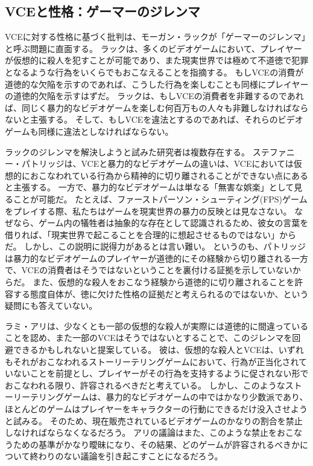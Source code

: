 \documentclass[paper=a4,book,openany]{jlreq} \usepackage{mystyle}
\begin{document}
\subsection{VCEと性格：ゲーマーのジレンマ}

VCEに対する性格に基づく批判は、モーガン・ラックが「ゲーマーのジレンマ」と呼ぶ問題に直面する。
ラックは、多くのビデオゲームにおいて、プレイヤーが仮想的に殺人を犯すことが可能であり、また現実世界では極めて不道徳で犯罪となるような行為をいくらでもおこなえることを指摘する。
もしVCEの消費が道徳的な欠陥を示すのであれば、こうした行為を楽しむことも同様にプレイヤーの道徳的欠陥を示すはずだ。
ラックは、もしVCEの消費者を非難するのであれば、同じく暴力的なビデオゲームを楽しむ何百万もの人々も非難しなければならないと主張する。
そして、もしVCEを違法とするのであれば、それらのビデオゲームも同様に違法としなければならない\citep{luck09:_gamer_dilem}。

ラックのジレンマを解決しようと試みた研究者は複数存在する。
ステファニー・パトリッジは、VCEと暴力的なビデオゲームの違いは、VCEにおいては仮想的におこなわれている行為から精神的に切り離されることができない点にあると主張する。
一方で、暴力的なビデオゲームは単なる「無害な娯楽」として見ることが可能だ。
たとえば、ファーストパーソン・シューティング(FPS)ゲームをプレイする際、私たちはゲームを現実世界の暴力の反映とは見なさない。
なぜなら、ゲーム内の犠牲者は抽象的な存在として認識されるため、彼女の言葉を借りれば、「現実世界で起こることを合理的に想起させるものではない」からだ\citep[p.33]{patridge13:_pornog_ethic_video_games}。
しかし、この説明に説得力があるとは言い難い。
というのも、パトリッジは暴力的なビデオゲームのプレイヤーが道徳的にその経験から切り離される一方で、VCEの消費者はそうではないということを裏付ける証拠を示していないからだ。
また、仮想的な殺人をおこなう経験から道徳的に切り離されることを許容する態度自体が、徳に欠けた性格の証拠だと考えられるのではないか、という疑問にも答えていない。

ラミ・アリは、少なくとも一部の仮想的な殺人が実際には道徳的に間違っていることを認め、また一部のVCEはそうではないとすることで、このジレンマを回避できるかもしれないと提案している。
彼は、仮想的な殺人とVCEは、いずれもそれがおこなわれるストーリーテリングゲームにおいて、行為が正当化されていないことを前提とし、プレイヤーがその行為を支持するように促されない形でおこなわれる限り、許容されるべきだと考えている\citep{ali15:_new_solut_gamer_dilem}。
しかし、このようなストーリーテリングゲームは、暴力的なビデオゲームの中ではかなり少数派であり、ほとんどのゲームはプレイヤーをキャラクターの行動にできるだけ没入させようと試みる。
そのため、現在販売されているビデオゲームのかなりの割合を禁止しなければならなくなるだろう。
アリの議論はまた、このような禁止をおこなうための基準がかなり曖昧になり、その結果、どのゲームが許容されるべきかについて終わりのない議論を引き起こすことになるだろう。
\end{document}
